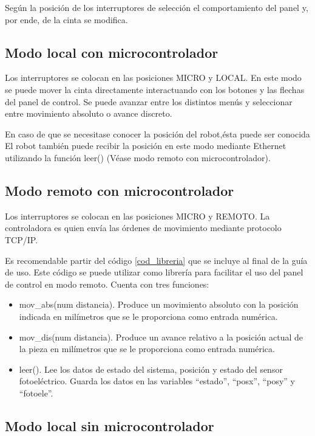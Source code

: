Según la posición de los interruptores de selección el comportamiento del panel y, por ende, de la cinta se modifica.

\subsection{Modo local con microcontrolador}

Los interruptores se colocan en las posiciones  MICRO y LOCAL. En este modo se puede mover la cinta directamente interactuando con los botones y las flechas del panel de control. Se puede avanzar entre los distintos menús y seleccionar entre movimiento absoluto o avance discreto.

En caso de que se necesitase conocer la posición del robot,ésta puede ser conocida El robot también puede recibir la posición en este modo mediante Ethernet utilizando la función leer() (Véase modo remoto con microcontrolador).

\subsection{Modo remoto con microcontrolador}

Los interruptores se colocan en las posiciones MICRO y REMOTO. La controladora es quien envía las órdenes de movimiento mediante protocolo TCP/IP.

Es recomendable partir del código \ref{cod_libreria} que se incluye al final de la guía de uso. Este código se puede utilizar como librería para facilitar el uso del panel de control en modo remoto. Cuenta con tres funciones:
\begin{itemize}
    \item mov\_abs(num distancia). Produce un movimiento absoluto con la posición indicada en milímetros que se le proporciona como entrada numérica.
    \item mov\_dis(num distancia). Produce un avance relativo a la posición actual de la pieza en milímetros que se le proporciona como entrada numérica.
    \item leer(). Lee los datos de estado del sistema, posición y estado del sensor fotoeléctrico. Guarda los datos en las variables “estado”, “posx”, “posy” y “fotoele”.
\end{itemize}

\subsection{Modo local sin microcontrolador}

